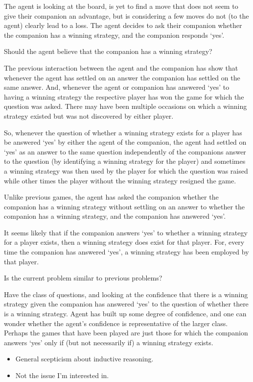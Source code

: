 \documentclass[10pt]{article}
\begin{document}
The agent is looking at the board, is yet to find a move that does not seem to give their companion an advantage, but is considering a few moves do not (to the agent) clearly lead to a loss.
The agent decides to ask their companion whether the companion has a winning strategy, and the companion responds `yes'.

Should the agent believe that the companion has a winning strategy?

The previous interaction between the agent and the companion has show that whenever the agent has settled on an answer the companion has settled on the same answer.
And, whenever the agent or companion has answered `yes' to having a winning strategy the respective player has won the game for which the question was asked.
There may have been multiple occasions on which a winning strategy existed but was not discovered by either player.

So, whenever the question of whether a winning strategy exists for a player has be answered `yes' by either the agent of the companion, the agent had settled on `yes' as an answer to the same question independently of the companions answer to the question (by identifying a winning strategy for the player) and sometimes a winning strategy was then used by the player for which the question was raised while other times the player without the winning strategy resigned the game.

Unlike previous games, the agent has asked the companion whether the companion has a winning strategy without settling on an answer to whether the companion has a winning strategy, and the companion has answered `yes'.

It seems likely that if the companion answers `yes' to whether a winning strategy for a player exists, then a winning strategy does exist for that player.
For, every time the companion has answered `yes', a winning strategy has been employed by that player.

Is the current problem similar to previous problems?

Have the class of questions, and looking at the confidence that there is a winning strategy given the companion has answered `yes' to the question of whether there is a winning strategy.
Agent has built up some degree of confidence, and one can wonder whether the agent's confidence is representative of the larger class.
Perhaps the games that have been played are just those for which the companion answers `yes' only if (but not necessarily if) a winning strategy exists.
\begin{itemize}
\item General scepticism about inductive reasoning.
\item Not the issue I'm interested in.
\end{itemize}
\end{document}
